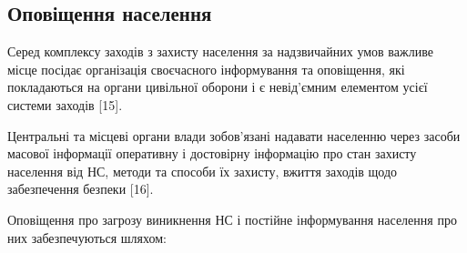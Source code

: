\subsection{Оповіщення населення}

Серед комплексу заходів з захисту населення за надзвичайних умов важливе місце посідає організація своєчасного інформування та оповіщення, які покладаються на органи цивільної оборони і є невід’ємним елементом усієї системи заходів [15].

Центральні та місцеві органи влади зобов’язані надавати населенню через засоби масової інформації оперативну і достовірну інформацію про стан захисту населення від НС, методи та способи їх захисту, вжиття заходів щодо забезпечення безпеки [16].

Оповіщення про загрозу виникнення НС і постійне інформування населення про них забезпечуються шляхом:

